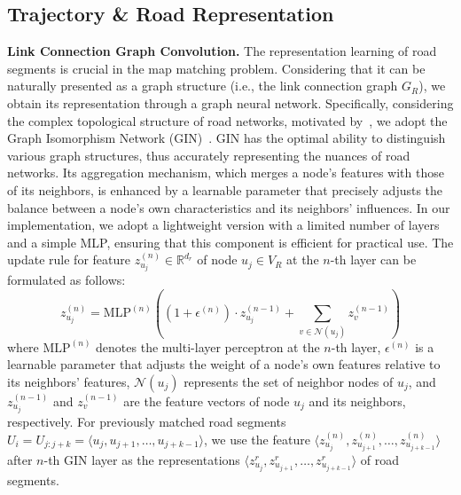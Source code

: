 \subsection{Trajectory \& Road Representation}
\label{sec:4.1}
\noindent \textbf{Link Connection Graph Convolution.} The representation learning of road segments is crucial in the map matching problem. Considering that it can be naturally presented as a graph structure (i.e., the link connection graph $G_R$), we obtain its representation through a graph neural network. Specifically, considering the complex topological structure of road networks, motivated by~\cite{graphmm}, we adopt the Graph Isomorphism Network (GIN)~\cite{GIN}. GIN has the optimal ability to distinguish various graph structures, thus accurately representing the nuances of road networks. Its aggregation mechanism, which merges a node's features with those of its neighbors, is enhanced by a learnable parameter that precisely adjusts the balance between a node's own characteristics and its neighbors' influences. In our implementation, we adopt a lightweight version with a limited number of layers and a simple MLP, ensuring that this component is efficient for practical use. The update rule for feature $z_{u_j}^{(n)} \in \mathbb{R}^{d_r}$ of node $u_j \in V_R$ at the $n$-th layer can be formulated as follows:
\begin{equation}
    z_{u_j}^{(n)} = \text{MLP}^{(n)} ( (1 + \epsilon^{(n)}) \cdot z_{u_j}^{(n-1)} + \sum_{v \in \mathcal{N}(u_j)} z_v^{(n-1)})
\end{equation}
where $\text{MLP}^{(n)}$ denotes the multi-layer perceptron at the $n$-th layer, $\epsilon^{(n)}$ is a learnable parameter that adjusts the weight of a node's own features relative to its neighbors' features, $\mathcal{N}(u_j)$ represents the set of neighbor nodes of $u_j$, and $z_{u_j}^{(n-1)}$ and $z_{v}^{(n-1)}$ are the feature vectors of node $u_j$ and its neighbors, respectively. 
For previously matched road segments $U_i=U_{j:j+k}=\langle u_j, u_{j+1}, \ldots, u_{j+k-1} \rangle$, we use the feature $\langle z_{u_j}^{(n)}, z_{u_{j+1}}^{(n)}, \ldots, z_{u_{j+k-1}}^{(n)} \rangle$ after $n$-th GIN layer as the representations $\langle z_{u_j}^{r}, z_{u_{j+1}}^{r}, \ldots, z_{u_{j+k-1}}^{r} \rangle$ of road segments.


